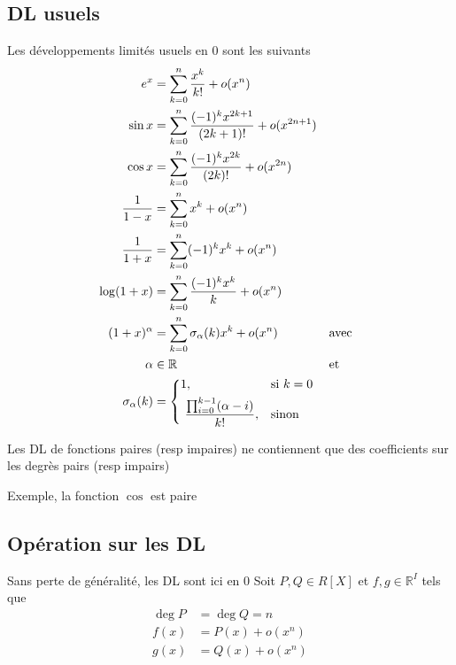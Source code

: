 \documentclass[11pt,colorlinks]{book}
\theoremstyle{mytheoremstyle}
\theoremstyle{mytheoremstyle}
\theoremstyle{mytheoremstyle}
\theoremstyle{mytheoremstyle}
\theoremstyle{mytheoremstyle}
\theoremstyle{mytheoremstyle}
\theoremstyle{mytheoremstyle}
\theoremstyle{mytheoremstyle}
\theoremstyle{myproblemstyle}
\def\mbb#1{\mathbb{#1}}
\def\bR{\mbb{R}}
\begin{document}
  \subsection{DL usuels}
  \begin{prop}
    Les développements limités usuels en 0 sont les suivants
    \begin{align*}
      e^x &= \sum_{k=0}^{n} \dfrac{x^k}{k!} + o(x^n) \\
      \sin x &= \sum_{k=0}^{n} \dfrac{(-1)^{k} x^{2k+1}}{(2k+1)!} + o(x^{2n+1}) \\ 
      \cos x &= \sum_{k=0}^{n} \dfrac{(-1)^{k} x^{2k}}{(2k)!} + o(x^{2n}) \\
      \dfrac{1}{1-x} &= \sum_{k=0}^{n} x^k + o(x^n) \\ 
      \dfrac{1}{1+x} &= \sum_{k=0}^{n} (-1)^k x^k + o(x^n) \\ 
      \log (1+x) &= \sum_{k=0}^n \dfrac{(-1)^k x^k}{k} + o(x^n) \\ 
      (1+x)^{\alpha} &= \sum_{k=0}^{n} \sigma_{\alpha}(k) x^k + o(x^n) && \text{avec} \\
      \alpha &\in \bR && \text{et} \\
      \sigma_{\alpha}(k) &= 
      \begin{dcases}
        1 ,& \text{si } k=0 \\ 
        \dfrac{\prod_{i=0}^{k-1} (\alpha - i)}{k!} ,& \text{sinon}
      \end{dcases}
    \end{align*}
  \end{prop}
  \begin{rmq}
    Les DL de fonctions paires (resp impaires) ne contiennent que des coefficients sur les degrès pairs (resp impairs)
    \begin{ex}
      Exemple, la fonction $\cos$ est paire
    \end{ex}
  \end{rmq}
  \subsection{Opération sur les DL}
  Sans perte de généralité, les DL sont ici en $0$  \newline
  Soit $P,Q \in R[X]$ et $f,g \in \bR^{I}$ tels que 
  \begin{align*}
    \deg P &= \deg Q = n \\ 
    f(x) &= P(x) + o(x^n) \\ 
    g(x) &= Q(x) + o(x^n)
  \end{align*}
\end{document}
